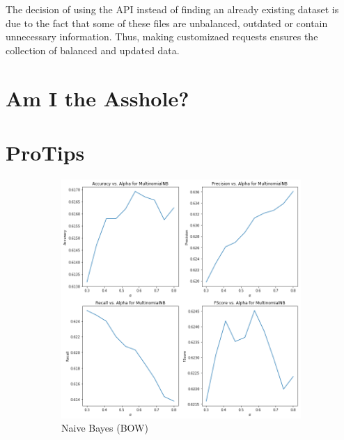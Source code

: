 \documentclass[11pt,a4paper]{article}
\begin{document}
The decision of using the API instead of finding an already existing dataset is 
due to the fact that some of these files are unbalanced, outdated or contain unnecessary information. Thus, making customizaed requests ensures the collection of balanced and updated data. 

\section{Am I the Asshole?}
\label{sec:aita}

\section{ProTips}
\label{sec:protips}
\begin{figure}[h!] %
\centering
	\begin{subfigure}[h!]{0.3\textwidth}
		\includegraphics[width=\linewidth]{plots_nb.png}
		\caption{Naive Bayes (BOW)}
		\label{fig:nb_val}
	\end{subfigure}
	~
	\begin{subfigure}[h!]{0.3\textwidth}

\end{subfigure}
\end{figure}
\end{document}
